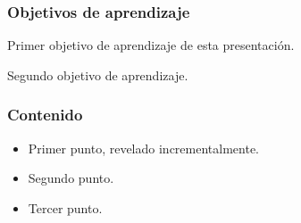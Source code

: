 \documentclass{ltx-talk}
\title{\icv@titulo}
\subtitle{\icv@subtitulo}
\author{\icv@profesor}
\institute{\icv@asignatura}
\date{\icv@periodo}
\begin{document}
\begin{frame}
  \maketitle[framestyle = wallpaper, horizontal-alignment = left]
\end{frame}

\begin{frame}
  \frametitle{Objetivos de aprendizaje}
  \begin{icvobjectives}
    \item Primer objetivo de aprendizaje de esta presentación.
    \item Segundo objetivo de aprendizaje.
  \end{icvobjectives}
\end{frame}

\begin{frame}
  \frametitle{Contenido}
  \begin{itemize}[action-spec = <+->]
    \item Primer punto, revelado incrementalmente.
    \item Segundo punto.
    \item Tercer punto.
  \end{itemize}
\end{frame}
\end{document}
